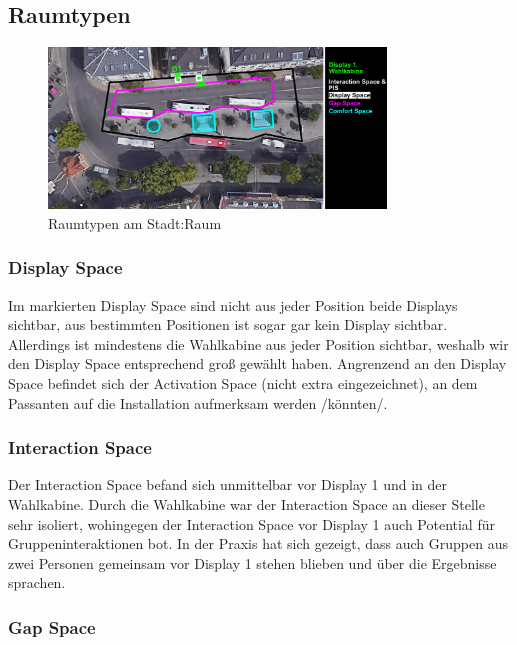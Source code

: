 \subsection{Raumtypen}\label{raumtypen}

\begin{figure}[ht]
    \centering
    \includegraphics[width=0.8\textwidth]{figures/raumtypen.pdf}
    \caption{Raumtypen am Stadt:Raum}
    \label{fig:raumtypen}
\end{figure}

\subsubsection{Display Space}\label{display-space}

Im markierten Display Space sind nicht aus jeder Position beide Displays sichtbar, aus bestimmten Positionen ist sogar gar kein Display sichtbar.
Allerdings ist mindestens die Wahlkabine aus jeder Position sichtbar, weshalb wir den Display Space entsprechend groß gewählt haben.
Angrenzend an den Display Space befindet sich der Activation Space (nicht extra eingezeichnet), an dem Passanten auf die Installation aufmerksam werden /könnten/.

\subsubsection{Interaction Space}\label{interaction-space}

Der Interaction Space befand sich unmittelbar vor Display 1 und in der Wahlkabine.
Durch die Wahlkabine war der Interaction Space an dieser Stelle sehr isoliert, wohingegen der Interaction Space vor Display 1 auch Potential für Gruppeninteraktionen bot.
In der Praxis hat sich gezeigt, dass auch Gruppen aus zwei Personen gemeinsam vor Display 1 stehen blieben und über die Ergebnisse sprachen.

\subsubsection{Gap Space}\label{gap-space}

